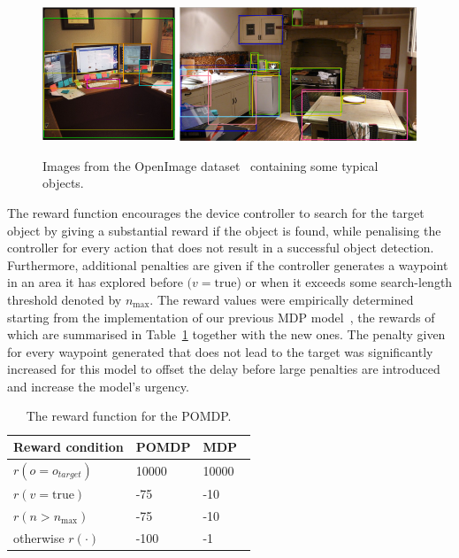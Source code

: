 \documentclass[runningheads]{llncs}
\DeclareRobustCommand{\tofix}[1]{{\sethlcolor{yellow}\hl{[#1]}}}
\begin{document}
\begin{figure}[t]
  \centering
  \includegraphics[height=4cm]{figures/desk_example.png} \hfil
  \includegraphics[height=4cm]{figures/kitchen_example_thicc.png}
  \caption{Images from the OpenImage dataset~\cite{openimages} containing some typical objects.}\label{fig:openimage}
\end{figure}

The reward function encourages the device controller to search for the target object by giving a substantial reward if the object is found, while penalising the controller for every action that does not result in a successful object detection.
Furthermore, additional penalties are given if the controller generates a waypoint in an area it has explored before $(v = \textrm{true}$) or when it exceeds some search-length threshold denoted by $n_{\max}$.
The reward values were empirically determined starting from the implementation of our previous MDP model~\cite{lock2019active}, the rewards of which are summarised in Table~\ref{tab:rewards} together with the new ones. %
The penalty given for every waypoint generated that does not lead to the target was significantly increased for this model to offset the delay before large penalties are introduced and increase the model's urgency. 

\begin{table}
  \centering
  \caption{The reward function for the POMDP. }\label{tab:rewards}
  \begin{tabular}{p{3cm}p{2cm}p{2cm}}
    \toprule
    Reward condition        & POMDP  & MDP~\cite{lock2019active}   \\ \midrule
    $r(o = o_{target})$     & 10000  & 10000 \\ 
    $r(v = \textrm{true})$  & -75    & -10   \\
    $r(n > n_{\max})$       & -75    & -10   \\
    otherwise $r(\cdot)$    & -100   & -1    \\
    \bottomrule
  \end{tabular}
\end{table}
\end{document}
